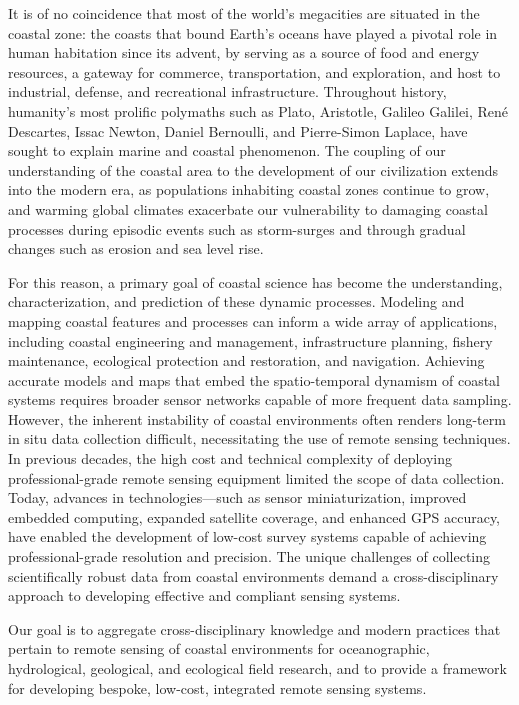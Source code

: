 \documentclass{article}
\begin{document}
\par{It is of no coincidence that most of the world's megacities are situated in the coastal zone: the coasts that bound Earth’s oceans have played a pivotal role in human habitation since its advent, by serving as a source of food and energy resources, a gateway for commerce, transportation, and exploration, and host to industrial, defense, and recreational infrastructure. Throughout history, humanity's most prolific polymaths such as Plato, Aristotle, Galileo Galilei, René Descartes, Issac Newton, Daniel Bernoulli, and Pierre-Simon Laplace, have sought to explain marine and coastal phenomenon. The coupling of our understanding of the coastal area to the development of our civilization extends into the modern era, as populations inhabiting coastal zones continue to grow, and warming global climates exacerbate our vulnerability to damaging coastal processes during episodic events such as storm-surges and through gradual changes such as erosion and sea level rise.}

\par{For this reason, a primary goal of coastal science has become the understanding, characterization, and prediction of these dynamic processes. Modeling and mapping coastal features and processes can inform a wide array of applications, including coastal engineering and management, infrastructure planning, fishery maintenance, ecological protection and restoration, and navigation. Achieving accurate models and maps that embed the spatio-temporal dynamism of coastal systems requires broader sensor networks capable of more frequent data sampling. However, the inherent instability of coastal environments often renders long-term in situ data collection difficult, necessitating the use of remote sensing techniques. In previous decades, the high cost and technical complexity of deploying professional-grade remote sensing equipment limited the scope of data collection. Today, advances in technologies—such as sensor miniaturization, improved embedded computing, expanded satellite coverage, and enhanced GPS accuracy, have enabled the development of low-cost survey systems capable of achieving professional-grade resolution and precision. The unique challenges of collecting scientifically robust data from coastal environments demand a cross-disciplinary approach to developing effective and compliant sensing systems.}

\par{Our goal is to aggregate cross-disciplinary knowledge and modern practices that pertain to remote sensing of coastal environments for oceanographic, hydrological, geological, and ecological field research, and to provide a framework for developing bespoke, low-cost, integrated remote sensing systems.}
\end{document}
